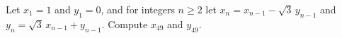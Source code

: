Let $x_1=1$ and $y_1=0$, and for integers $n\ge2$ let $x_n=x_{n-1}-\sqrt3\,y_{n-1}$ and $y_n=\sqrt3\,x_{n-1}+y_{n-1}$. Compute $x_{49}$ and $y_{49}$.
